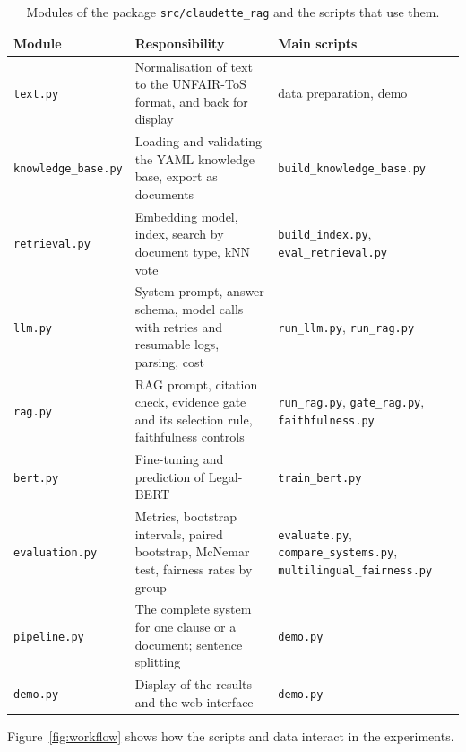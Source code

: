 \begin{table}[ht]
\centering\small
\caption{Modules of the package \texttt{src/claudette\_rag} and the scripts that use them.}
\label{tab:modules}
\begin{tabularx}{\textwidth}{@{}p{2.9cm}YP{4.4cm}@{}}
\toprule
Module & Responsibility & Main scripts \\
\midrule
\texttt{text.py} & Normalisation of text to the UNFAIR-ToS format, and back for display & data preparation, demo \\
\texttt{knowledge\_base.py} & Loading and validating the YAML knowledge base, export as documents & \texttt{build\_knowledge\_base.py} \\
\texttt{retrieval.py} & Embedding model, index, search by document type, kNN vote & \texttt{build\_index.py}, \texttt{eval\_retrieval.py} \\
\texttt{llm.py} & System prompt, answer schema, model calls with retries and resumable logs, parsing, cost & \texttt{run\_llm.py}, \texttt{run\_rag.py} \\
\texttt{rag.py} & RAG prompt, citation check, evidence gate and its selection rule, faithfulness controls & \texttt{run\_rag.py}, \texttt{gate\_rag.py}, \texttt{faithfulness.py} \\
\texttt{bert.py} & Fine-tuning and prediction of Legal-BERT & \texttt{train\_bert.py} \\
\texttt{evaluation.py} & Metrics, bootstrap intervals, paired bootstrap, McNemar test, fairness rates by group & \texttt{evaluate.py}, \texttt{compare\_systems.py}, \texttt{multilingual\_fairness.py} \\
\texttt{pipeline.py} & The complete system for one clause or a document; sentence splitting & \texttt{demo.py} \\
\texttt{demo.py} & Display of the results and the web interface & \texttt{demo.py} \\
\bottomrule
\end{tabularx}
\end{table}

Figure~\ref{fig:workflow} shows how the scripts and data interact in the experiments.

